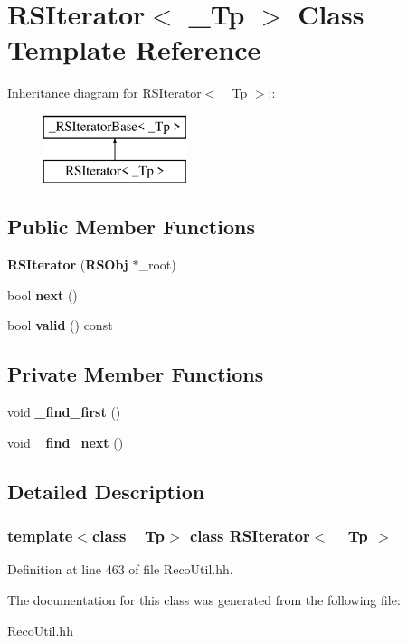\section{RSIterator$<$ \_\-Tp $>$ Class Template Reference}
\label{classRSIterator}
Inheritance diagram for RSIterator$<$ \_\-Tp $>$::\begin{figure}[H]
\begin{center}
\leavevmode
\includegraphics[height=2cm]{classRSIterator}
\end{center}
\end{figure}
\subsection*{Public Member Functions}
\begin{DoxyCompactItemize}
\item 
{\bfseries RSIterator} ({\bf RSObj} $\ast$\_\-root)\label{classRSIterator_a45c2bba6dbcadf418450aa27ac07cc66}

\item 
bool {\bfseries next} ()\label{classRSIterator_a218c6e684151e411d51be7f09ef78cd1}

\item 
bool {\bfseries valid} () const \label{classRSIterator_a0a764a811e825fc874152ba072abb6bf}

\end{DoxyCompactItemize}
\subsection*{Private Member Functions}
\begin{DoxyCompactItemize}
\item 
void {\bfseries \_\-find\_\-first} ()\label{classRSIterator_a0eecc732b9c10c1b66cfe6254eac0a62}

\item 
void {\bfseries \_\-find\_\-next} ()\label{classRSIterator_af89e993afce640fe59ed3a1d34cd35d5}

\end{DoxyCompactItemize}


\subsection{Detailed Description}
\subsubsection*{template$<$class \_\-Tp$>$ class RSIterator$<$ \_\-Tp $>$}



Definition at line 463 of file RecoUtil.hh.

The documentation for this class was generated from the following file:\begin{DoxyCompactItemize}
\item 
RecoUtil.hh\end{DoxyCompactItemize}
